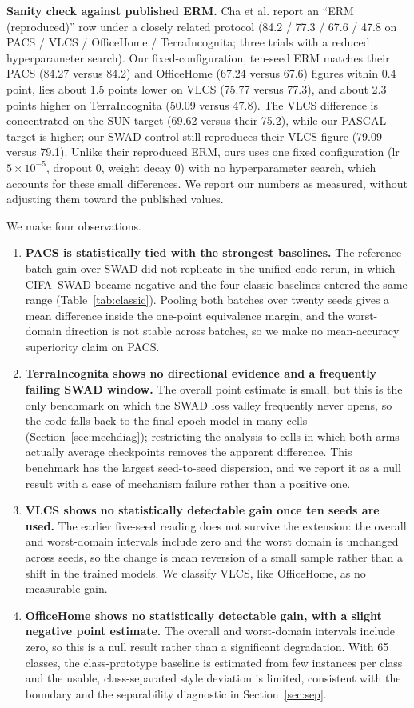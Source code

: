 \documentclass[electronics,article,submit,moreauthors]{Definitions/mdpi}
\begin{document}
\textbf{Sanity check against published ERM.} Cha et al. report an ``ERM (reproduced)'' row under a closely related protocol (84.2 / 77.3 / 67.6 / 47.8 on PACS / VLCS / OfficeHome / TerraIncognita; three trials with a reduced hyperparameter search). Our fixed-configuration, ten-seed ERM matches their PACS (84.27 versus 84.2) and OfficeHome (67.24 versus 67.6) figures within 0.4 point, lies about 1.5 points lower on VLCS (75.77 versus 77.3), and about 2.3 points higher on TerraIncognita (50.09 versus 47.8). The VLCS difference is concentrated on the SUN target (69.62 versus their 75.2), while our PASCAL target is higher; our SWAD control still reproduces their VLCS figure (79.09 versus 79.1). Unlike their reproduced ERM, ours uses one fixed configuration (lr $5\times10^{-5}$, dropout 0, weight decay 0) with no hyperparameter search, which accounts for these small differences. We report our numbers as measured, without adjusting them toward the published values.

We make four observations.
\begin{enumerate}
\item \textbf{PACS is statistically tied with the strongest baselines.} The reference-batch gain over SWAD did not replicate in the unified-code rerun, in which CIFA--SWAD became negative and the four classic baselines entered the same range (Table~\ref{tab:classic}). Pooling both batches over twenty seeds gives a mean difference inside the one-point equivalence margin, and the worst-domain direction is not stable across batches, so we make no mean-accuracy superiority claim on PACS.
\item \textbf{TerraIncognita shows no directional evidence and a frequently failing SWAD window.} The overall point estimate is small, but this is the only benchmark on which the SWAD loss valley frequently never opens, so the code falls back to the final-epoch model in many cells (Section~\ref{sec:mechdiag}); restricting the analysis to cells in which both arms actually average checkpoints removes the apparent difference. This benchmark has the largest seed-to-seed dispersion, and we report it as a null result with a case of mechanism failure rather than a positive one.
\item \textbf{VLCS shows no statistically detectable gain once ten seeds are used.} The earlier five-seed reading does not survive the extension: the overall and worst-domain intervals include zero and the worst domain is unchanged across seeds, so the change is mean reversion of a small sample rather than a shift in the trained models. We classify VLCS, like OfficeHome, as no measurable gain.
\item \textbf{OfficeHome shows no statistically detectable gain, with a slight negative point estimate.} The overall and worst-domain intervals include zero, so this is a null result rather than a significant degradation. With 65 classes, the class-prototype baseline is estimated from few instances per class and the usable, class-separated style deviation is limited, consistent with the boundary and the separability diagnostic in Section~\ref{sec:sep}.
\end{enumerate}
\end{document}
